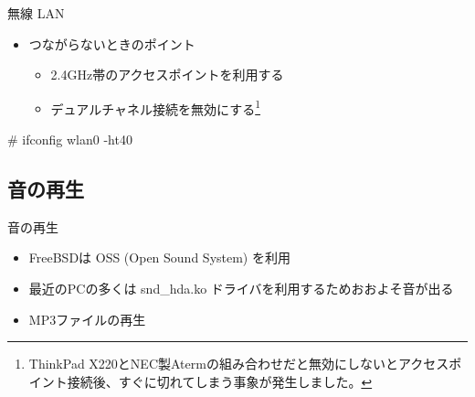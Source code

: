 \begin{frame}[containsverbatim]{無線 LAN}
\begin{itemize}
  \item つながらないときのポイント
    \begin{itemize}
    \item 2.4GHz帯のアクセスポイントを利用する
    \item デュアルチャネル接続を無効にする\footnote{ThinkPad X220とNEC製Atermの組み合わせだと無効にしないとアクセスポイント接続後、すぐに切れてしまう事象が発生しました。}
    \end{itemize}
  \end{itemize}

\begin{commandlinesmall}
# ifconfig wlan0 -ht40
\end{commandlinesmall}

\end{frame}


\subsection{音の再生}
\begin{frame}[containsverbatim]{音の再生}
  \begin{itemize}
  \item FreeBSDは OSS (Open Sound System) を利用
  \item 最近のPCの多くは snd\_hda.ko ドライバを利用するためおおよそ音が出る
  \item MP3ファイルの再生
  \end{itemize}


\end{frame}

